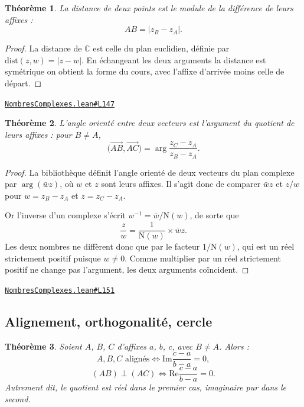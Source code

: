\documentclass[11pt,a4paper]{article}
\theoremstyle{definition}
\theoremstyle{plain}
\newtheorem{theoreme}{Théorème}
\newcommand{\source}[2]{\par\smallskip\noindent\hfill{\footnotesize\href{#1}{\texttt{#2}}}\par\smallskip}
\begin{document}
\begin{theoreme}
La distance de deux points est le module de la différence de leurs affixes :
\[ AB = |z_B - z_A| . \]
\end{theoreme}

\begin{proof}
La distance de $\mathbb{C}$ est celle du plan euclidien, définie par
$\mathrm{dist}(z, w) = |z - w|$. En échangeant les deux arguments \textemdash{} la
distance est symétrique \textemdash{} on obtient la forme du cours, avec l'affixe
d'arrivée moins celle de départ.
\end{proof}
\source{https://github.com/Commutator-IO/learn-lean/blob/main/courses/02-lycee/07-nombres-complexes/NombresComplexes.lean\#L147}{NombresComplexes.lean\#L147}

\begin{theoreme}
L'angle orienté entre deux vecteurs est l'argument du quotient de leurs affixes : pour
$B \ne A$,
\[ \bigl(\overrightarrow{AB}, \overrightarrow{AC}\bigr)
   = \arg\frac{z_C - z_A}{z_B - z_A} . \]
\end{theoreme}

\begin{proof}
La bibliothèque définit l'angle orienté de deux vecteurs du plan complexe par
$\arg(\bar w z)$, où $w$ et $z$ sont leurs affixes. Il s'agit donc de comparer $\bar w z$
et $z/w$ pour $w = z_B - z_A$ et $z = z_C - z_A$.

Or l'inverse d'un complexe s'écrit $w^{-1} = \bar w / \mathrm{N}(w)$, de sorte que
\[ \frac{z}{w} = \frac{1}{\mathrm{N}(w)} \times \bar w z . \]
Les deux nombres ne diffèrent donc que par le facteur $1/\mathrm{N}(w)$, qui est un réel
strictement positif puisque $w \ne 0$. Comme multiplier par un réel strictement positif ne
change pas l'argument, les deux arguments coïncident.
\end{proof}
\source{https://github.com/Commutator-IO/learn-lean/blob/main/courses/02-lycee/07-nombres-complexes/NombresComplexes.lean\#L151}{NombresComplexes.lean\#L151}

\subsection{Alignement, orthogonalité, cercle}

\begin{theoreme}
Soient $A$, $B$, $C$ d'affixes $a$, $b$, $c$, avec $B \ne A$. Alors :
\[ A, B, C \text{ alignés} \iff \mathrm{Im}\frac{c - a}{b - a} = 0 , \]
\[ (AB) \perp (AC) \iff \mathrm{Re}\frac{c - a}{b - a} = 0 . \]
Autrement dit, le quotient est réel dans le premier cas, imaginaire pur dans le second.
\end{theoreme}
\end{document}
